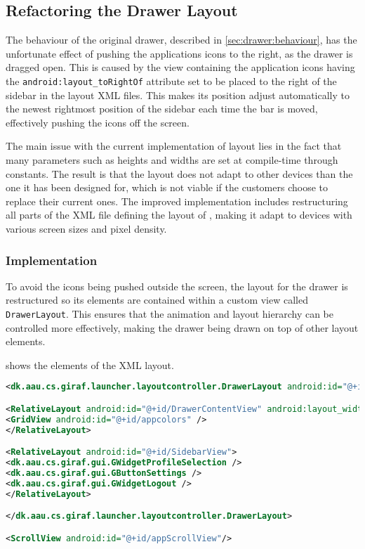\subsection{Refactoring the Drawer Layout}
The behaviour of the original drawer, described in \cref{sec:drawer:behaviour}, has the unfortunate effect of pushing the applications icons to the right, as the drawer is dragged open.
This is caused by the view containing the application icons having the  \lstinline{android:layout_toRightOf} attribute set to be placed to the right of the sidebar in the layout XML files.
This makes its position adjust automatically to the newest rightmost position of the sidebar each time the bar is moved, effectively pushing the icons off the screen.

The main issue with the current implementation of \homeactivity layout lies in the fact that many parameters such as heights and widths are set at compile-time through constants.
The result is that the layout does not adapt to other devices than the one it has been designed for, which is not viable if the customers choose to replace their current ones.
The improved implementation includes restructuring all parts of the XML file defining the layout of  \homeactivity, making it adapt to devices with various screen sizes and pixel density.

\subsubsection{Implementation}\label{sec:sidebarlayout:xml}
To avoid the icons being pushed outside the screen, the layout for the drawer is restructured so its elements are contained within a custom view called \lstinline|DrawerLayout|.
This ensures that the animation and layout hierarchy can be controlled more effectively, making the drawer being drawn on top of other layout elements.

 shows the elements of the XML layout.

\begin{lstlisting}[caption={Structure of the XML layout of the drawer. Note that some attributes are omitted.},label={lst:sidebarlayout}, language=XML]
<dk.aau.cs.giraf.launcher.layoutcontroller.DrawerLayout android:id="@+id/DrawerView" android:layout_marginLeft="-400dp">

<RelativeLayout android:id="@+id/DrawerContentView" android:layout_width="400dp">
<GridView android:id="@+id/appcolors" />
</RelativeLayout>

<RelativeLayout android:id="@+id/SidebarView">
<dk.aau.cs.giraf.gui.GWidgetProfileSelection />
<dk.aau.cs.giraf.gui.GButtonSettings />
<dk.aau.cs.giraf.gui.GWidgetLogout />
</RelativeLayout>

</dk.aau.cs.giraf.launcher.layoutcontroller.DrawerLayout>

<ScrollView android:id="@+id/appScrollView"/>
\end{lstlisting}

